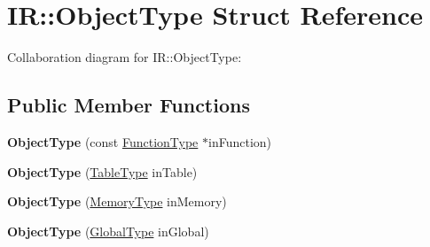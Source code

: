 \hypertarget{struct_i_r_1_1_object_type}{}\section{IR\+:\+:Object\+Type Struct Reference}
\label{struct_i_r_1_1_object_type}


Collaboration diagram for IR\+:\+:Object\+Type\+:
\subsection*{Public Member Functions}
\begin{DoxyCompactItemize}
\item 
\mbox{\label{struct_i_r_1_1_object_type_a37708fbed5f7a89af8fb064d9afffc0a}} 
{\bfseries Object\+Type} (const \mbox{\hyperlink{struct_i_r_1_1_function_type}{Function\+Type}} $\ast$in\+Function)
\item 
\mbox{\label{struct_i_r_1_1_object_type_a333ed3625f1eebc6e23b6841a192d42d}} 
{\bfseries Object\+Type} (\mbox{\hyperlink{struct_i_r_1_1_table_type}{Table\+Type}} in\+Table)
\item 
\mbox{\label{struct_i_r_1_1_object_type_afa81ee78e386bfd555180b10c0dbea06}} 
{\bfseries Object\+Type} (\mbox{\hyperlink{struct_i_r_1_1_memory_type}{Memory\+Type}} in\+Memory)
\item 
\mbox{\label{struct_i_r_1_1_object_type_a97108bba88c9062147e05a4f0fcedd8a}} 
{\bfseries Object\+Type} (\mbox{\hyperlink{struct_i_r_1_1_global_type}{Global\+Type}} in\+Global)
\end{DoxyCompactItemize}
